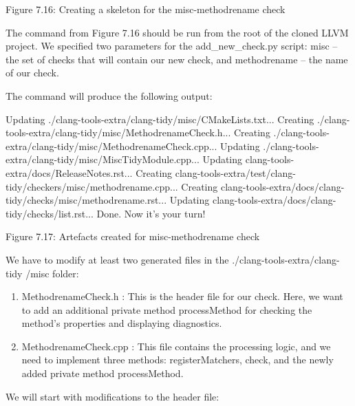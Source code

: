 
Figure 7.16: Creating a skeleton for the misc-methodrename check

The command from Figure 7.16 should be run from the root of the cloned LLVM project. We specified two parameters for the add\_new\_check.py script: misc – the set of checks that will contain our new check, and methodrename – the name of our check.

The command will produce the following output:

\begin{shell}
Updating ./clang-tools-extra/clang-tidy/misc/CMakeLists.txt...
Creating ./clang-tools-extra/clang-tidy/misc/MethodrenameCheck.h...
Creating ./clang-tools-extra/clang-tidy/misc/MethodrenameCheck.cpp...
Updating ./clang-tools-extra/clang-tidy/misc/MiscTidyModule.cpp...
Updating clang-tools-extra/docs/ReleaseNotes.rst...
Creating clang-tools-extra/test/clang-tidy/checkers/misc/methodrename.cpp...
Creating clang-tools-extra/docs/clang-tidy/checks/misc/methodrename.rst...
Updating clang-tools-extra/docs/clang-tidy/checks/list.rst...
Done. Now it's your turn!
\end{shell}

\begin{center}
Figure 7.17: Artefacts created for misc-methodrename check
\end{center}


We have to modify at least two generated files in the ./clang-tools-extra/clang-tidy /misc folder:

\begin{enumerate}
\item
MethodrenameCheck.h : This is the header file for our check. Here, we want to add an additional private method processMethod for checking the method's properties and displaying diagnostics.

\item
MethodrenameCheck.cpp : This file contains the processing logic, and we need to implement three methods: registerMatchers, check, and the newly added private method processMethod.
\end{enumerate}


We will start with modifications to the header file:

\begin{cpp}
private:
  void processMethod(const clang::CXXMethodDecl *Method,
                     clang::SourceLocation StartLoc, const char *LogMessage);
};
\end{cpp}

